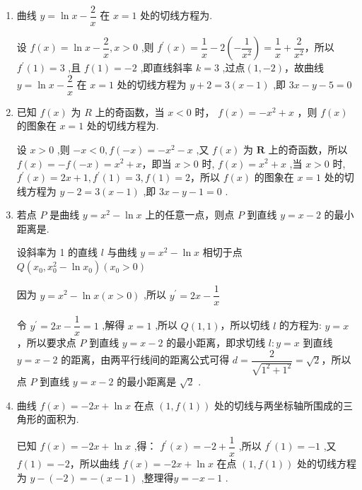 \begin{enumerate}
    \item 曲线 $y = \ln x - \dfrac{2}{x}$ 在 $x = 1$ 处的切线方程为.
    \begin{jieda}
        设 $f\left( x\right)  = \ln x - \dfrac{2}{x},x > 0$ ,则 ${f}^{\prime }\left( x\right)  = \dfrac{1}{x} - 2\left( {-\dfrac{1}{{x}^{2}}}\right)  = \dfrac{1}{x} + \dfrac{2}{{x}^{2}}$，所以 ${f}^{\prime }\left( 1\right)  = 3$ ,且 $f\left( 1\right)  =  - 2$ ,即直线斜率 $k = 3$ ,过点$(1, -2)$，故曲线 $y = \ln x - \dfrac{2}{x}$ 在 $x = 1$ 处的切线方程为 $y + 2 = 3\left( {x - 1}\right)$ ,即 ${3x} - y - 5 = 0$
    \end{jieda}

    \item 已知 $f\left( x\right)$ 为 ${R}$ 上的奇函数，当 $x < 0$ 时， $f\left( x\right)  =  - {x}^{2} + x$ ，则 $f\left( x\right)$ 的图象在 $x = 1$ 处的切线方程为.
    \begin{jieda}
        设 $x > 0$ ,则 $- x < 0,f\left( {-x}\right)  =  - {x}^{2} - x$ ,又 $f\left( x\right)$ 为 $\mathbf{R}$ 上的奇函数，所以 $f\left( x\right)  =  - f\left( {-x}\right)  = {x}^{2} + x$，即当 $x > 0$ 时, $f\left( x\right)  = {x}^{2} + x$ ,当 $x > 0$ 时, ${f}^{\prime }\left( x\right)  = {2x} + 1,{f}^{\prime }\left( 1\right)  = 3,f\left( 1\right)  = 2$，所以 $f\left( x\right)$ 的图象在 $x = 1$ 处的切线方程为 $y - 2 = 3\left( {x - 1}\right)$ ,即 ${3x} - y - 1 = 0$ .
    \end{jieda}

    \item 若点 $P$ 是曲线 $y = {x}^{2} - \ln x$ 上的任意一点，则点 $P$ 到直线 $y = x - 2$ 的最小距离是.
    \begin{jieda}
        设斜率为 1 的直线 $l$ 与曲线 $y = {x}^{2} - \ln x$ 相切于点 $Q\left( {{x}_{0},{x}_{0}^{2} - \ln {x}_{0}}\right) \left( {{x}_{0} > 0}\right)$ 
        
        因为 $y = {x}^{2} - \ln x\left( {x > 0}\right)$ ,所以 ${y}^{\prime } = {2x} - \dfrac{1}{x}$
        
        令 ${y}^{\prime } = {2x} - \dfrac{1}{x} = 1$ ,解得 $x = 1$ ,所以 $Q\left( {1,1}\right)$，所以切线 $l$ 的方程为: $y = x$，所以要求点 $P$ 到直线 $y = x - 2$ 的最小距离，即求切线 $l : y = x$ 到直线 $y = x - 2$ 的距离，由两平行线间的距离公式可得 $d = \dfrac{2}{\sqrt{{1}^{2} + {1}^{2}}} = \sqrt{2}$，所以点 $P$ 到直线 $y = x - 2$ 的最小距离是 $\sqrt{2}$ .
    \end{jieda}

    \item 曲线 $f\left( x\right)  =  - {2x} + \ln x$ 在点 $\left( {1,f\left( 1\right) }\right)$ 处的切线与两坐标轴所围成的三角形的面积为.
    \begin{jieda}
        已知 $f\left( x\right)  =  - {2x} + \ln x$ ,得： ${f}^{\prime }\left( x\right)  =  - 2 + \dfrac{1}{x}$ ,所以 ${f}^{\prime }\left( 1\right)  =  - 1$ ,又 $f\left( 1\right)  =  - 2$，所以曲线 $f\left( x\right)  =  - {2x} + \ln x$ 在点 $\left( {1,f\left( 1\right) }\right)$ 处的切线方程为 $y - \left( {-2}\right)  =  - \left( {x - 1}\right)$ ,整理得$y =  - x - 1$ .
        

\end{jieda}
\end{enumerate}
